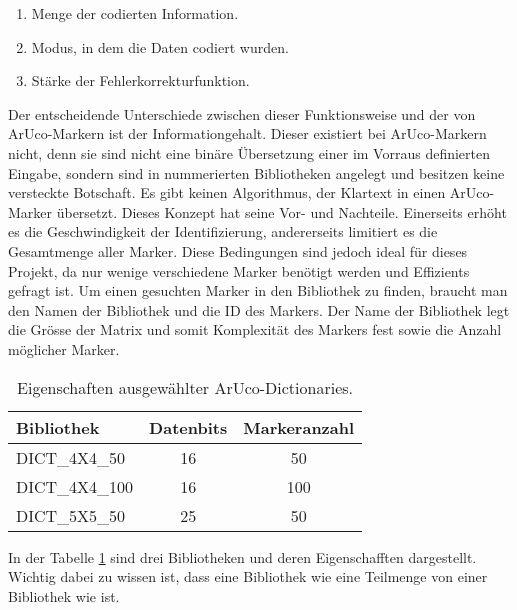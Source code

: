 \begin{enumerate}
    \item Menge der codierten Information.
    \item Modus, in dem die Daten codiert wurden.
    \item Stärke der Fehlerkorrekturfunktion.
\end{enumerate}

Der entscheidende Unterschiede zwischen dieser Funktionsweise und der von ArUco-Markern ist der Informationgehalt. Dieser existiert bei ArUco-Markern nicht, denn sie sind nicht eine binäre Übersetzung einer im Vorraus definierten Eingabe, sondern sind in nummerierten Bibliotheken angelegt und besitzen keine versteckte Botschaft. Es gibt keinen Algorithmus, der Klartext in einen ArUco-Marker übersetzt. Dieses Konzept hat seine Vor- und Nachteile. Einerseits erhöht es die Geschwindigkeit der Identifizierung, andererseits limitiert es die Gesamtmenge aller Marker. Diese Bedingungen sind jedoch ideal für dieses Projekt, da nur wenige verschiedene Marker benötigt werden und Effizients gefragt ist. 
Um einen gesuchten Marker in den Bibliothek zu finden, braucht man den Namen der Bibliothek und die ID des Markers. Der Name der Bibliothek legt die Grösse der Matrix und somit Komplexität des Markers fest sowie die Anzahl möglicher Marker.

\begin{table}[h]
    \centering
    \begin{tabular}{lcc}
        \toprule
        \textbf{Bibliothek} & \textbf{Datenbits} & \textbf{Markeranzahl} \\
        \midrule
        DICT\_4X4\_50 & 16 & 50 \\
        DICT\_4X4\_100 & 16 & 100 \\
        DICT\_5X5\_50 & 25 & 50 \\
        \bottomrule
    \end{tabular}
    \caption{Eigenschaften ausgewählter ArUco-Dictionaries.}
    \label{tab:aruco_dicts}
\end{table}

In der Tabelle \ref{tab:aruco_dicts} sind drei Bibliotheken und deren Eigenschafften dargestellt. Wichtig dabei zu wissen ist, dass eine Bibliothek wie  eine Teilmenge von einer Bibliothek wie  ist.

\endgroup